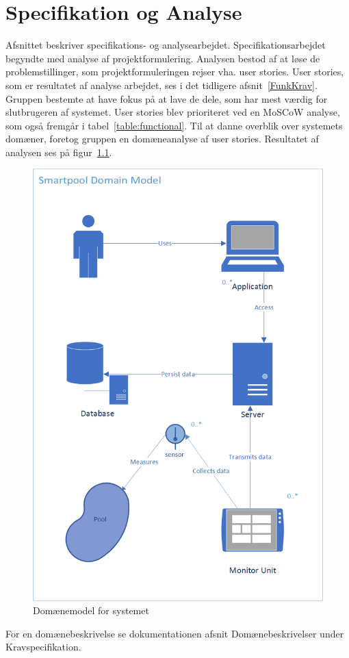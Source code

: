 \chapter{Specifikation og Analyse}\label{SpecOgAnalyse}
Afsnittet beskriver specifikations- og analysearbejdet. Specifikationsarbejdet begyndte med analyse af projektformulering. Analysen bestod af at løse de problemstillinger, som projektformuleringen rejser vha. user stories. User stories, som er resultatet af analyse arbejdet, ses i det tidligere afsnit~\ref{FunkKrav}. Gruppen bestemte at have fokus på at lave de dele, som har mest værdig for slutbrugeren af systemet. User stories blev prioriteret ved en MoSCoW analyse, som også fremgår i tabel~\ref{table:functional}. Til at danne overblik over systemets domæner, foretog gruppen en domæneanalyse af user stories. Resultatet af analysen ses på figur~\ref{fig:domainmodel}.

\begin{figure}
	\centering
	\includegraphics[width=0.7\linewidth]{figs/DomainModelGraphic}
	\caption{Domænemodel for systemet}
	\label{fig:domainmodel}
\end{figure}

For en domænebeskrivelse se dokumentationen afsnit Domænebeskrivelser under Kravspecifikation.


